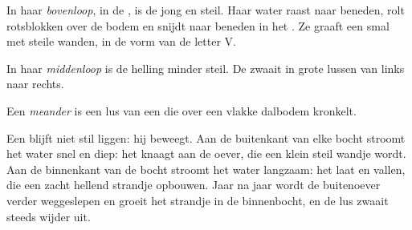 In haar \emph{bovenloop}, in de , is de  jong en steil. Haar
water raast naar beneden, rolt rotsblokken over de bodem en snijdt naar
beneden in het . Ze graaft een smal  met steile wanden, in de
vorm van de letter V.

In haar \emph{middenloop} is de helling minder steil. De  zwaait in
grote lussen van links naar rechts.

\begin{definition}[Meander]\label{def:g5:water-shapes-the-land:meander}
Een \emph{meander} is een lus van een  die over een
vlakke dalbodem kronkelt.
\end{definition}

Een  blijft niet stil liggen: hij beweegt. Aan de buitenkant van
elke bocht stroomt het water snel en diep: het knaagt aan de oever, die een
klein steil wandje wordt. Aan de binnenkant van de bocht stroomt het water
langzaam: het laat  en  vallen, die een zacht hellend strandje
opbouwen. Jaar na jaar wordt de buitenoever verder weggeslepen en groeit
het strandje in de binnenbocht, en de lus zwaait steeds wijder uit.

